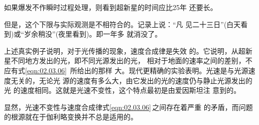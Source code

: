 如果爆发不作瞬时过程处理，则看到超新星的时间应比25年
还要长。

但是，这个下限与实际观测是不相符合的。记录上说：“凡
见二十三日”(白天看到)或“岁余稍没”(夜里看到)。即一年多
就消没了。

上述真实例子说明，对于光传播的现象，速度合成律是失效
的。它说明，从超新星不同地方发出的光，即不同光源发出的光，
相对于地面的速率之间的差别，不应有式\eqref{eqn:02.03.06}~所给出的那样
大。现代更精确的实验表明。光速是与光源速度无关的，无论光
源的速度有多么大，由它发出的光的速度仍与静止光源发出的光
的速度相同。这就是光速不变性，这个特点最初是由爱因斯坦注
意到的。

显然，光速不变性与速度合成律\lhbrak 式\eqref{eqn:02.03.06}\,\rhbrak 之间存在着严重
的矛盾，而问题的根源就在于伽利略变换并不总是适用的。